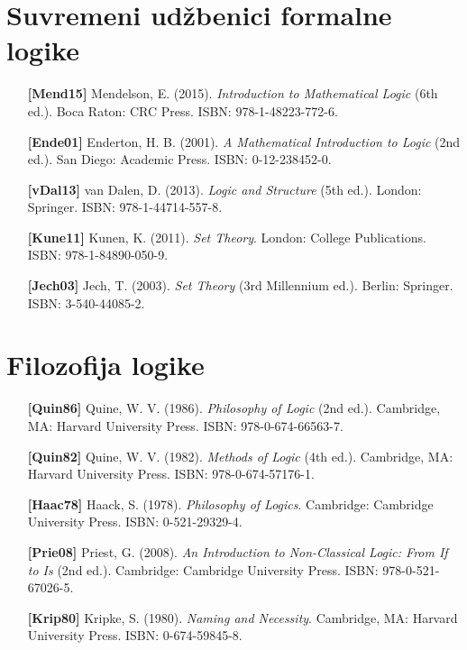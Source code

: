 \section{Suvremeni udžbenici formalne logike}

\begin{itemize}[leftmargin=2cm, labelsep=0.5cm, itemsep=0.3cm]

\item[\textbf{[Mend15]}] Mendelson, E. (2015). \textit{Introduction to Mathematical Logic} (6th ed.). Boca Raton: CRC Press. ISBN: 978-1-48223-772-6.

\item[\textbf{[Ende01]}] Enderton, H. B. (2001). \textit{A Mathematical Introduction to Logic} (2nd ed.). San Diego: Academic Press. ISBN: 0-12-238452-0.

\item[\textbf{[vDal13]}] van Dalen, D. (2013). \textit{Logic and Structure} (5th ed.). London: Springer. ISBN: 978-1-44714-557-8.

\item[\textbf{[Kune11]}] Kunen, K. (2011). \textit{Set Theory}. London: College Publications. ISBN: 978-1-84890-050-9.

\item[\textbf{[Jech03]}] Jech, T. (2003). \textit{Set Theory} (3rd Millennium ed.). Berlin: Springer. ISBN: 3-540-44085-2.

\end{itemize}

\section{Filozofija logike}

\begin{itemize}[leftmargin=2cm, labelsep=0.5cm, itemsep=0.3cm]

\item[\textbf{[Quin86]}] Quine, W. V. (1986). \textit{Philosophy of Logic} (2nd ed.). Cambridge, MA: Harvard University Press. ISBN: 978-0-674-66563-7.

\item[\textbf{[Quin82]}] Quine, W. V. (1982). \textit{Methods of Logic} (4th ed.). Cambridge, MA: Harvard University Press. ISBN: 978-0-674-57176-1.

\item[\textbf{[Haac78]}] Haack, S. (1978). \textit{Philosophy of Logics}. Cambridge: Cambridge University Press. ISBN: 0-521-29329-4.

\item[\textbf{[Prie08]}] Priest, G. (2008). \textit{An Introduction to Non-Classical Logic: From If to Is} (2nd ed.). Cambridge: Cambridge University Press. ISBN: 978-0-521-67026-5.

\item[\textbf{[Krip80]}] Kripke, S. (1980). \textit{Naming and Necessity}. Cambridge, MA: Harvard University Press. ISBN: 0-674-59845-8.

\end{itemize}

